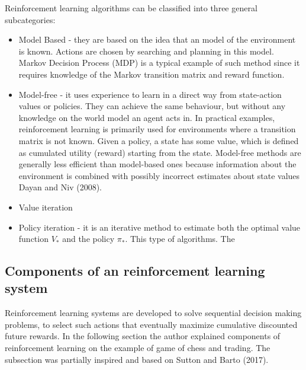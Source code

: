 \documentclass[]{article}
\begin{document}
Reinforcement learning algorithms can be classified into three general
subcategories:

\begin{itemize}
\item
  Model Based - they are based on the idea that an model of the
  environment is known. Actions are chosen by searching and planning in
  this model. Markov Decision Process (MDP) is a typical example of such
  method since it requires knowledge of the Markov transition matrix and
  reward function.
\item
  Model-free - it uses experience to learn in a direct way from
  state-action values or policies. They can achieve the same behaviour,
  but without any knowledge on the world model an agent acts in. In
  practical examples, reinforcement learning is primarily used for
  environments where a transition matrix is not known. Given a policy, a
  state has some value, which is defined as cumulated utility (reward)
  starting from the state. Model-free methods are generally less
  efficient than model-based ones because information about the
  environment is combined with possibly incorrect estimates about state
  values Dayan and Niv (2008).
\item
  Value iteration
\item
  Policy iteration - it is an iterative method to estimate both the
  optimal value function \(V_*\) and the policy \(\pi_*\). This type of
  algorithms. The
\end{itemize}

\subsection{Components of an reinforcement learning
system}\label{components-of-an-reinforcement-learning-system}

Reinforcement learning systems are developed to solve sequential
decision making problems, to select such actions that eventually
maximize cumulative discounted future rewards. In the following section
the author explained components of reinforcement learning on the example
of game of chess and trading. The subsection was partially inspired and
based on Sutton and Barto (2017).
\end{document}
